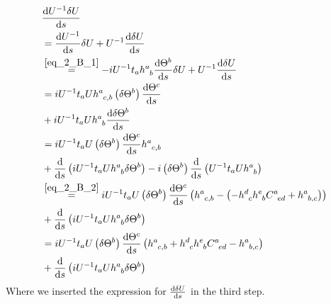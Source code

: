 \begin{align*} 
	&\derivative{U^{-1}\delta U}{s}\\
	&=\derivative{U^{-1}}{s}\delta U + U^{-1}\derivative{\delta U}{s}\\
	&\overset{\ref{eq_2_B_1}}{=}-iU^{-1} t_a h^a_{\hphantom{a}b}\derivative{\Theta^b}{s} \delta U + U^{-1}\derivative{\delta U}{s}\\
	&=i U^{-1} t_a U h^a_{\hphantom{a}c,b}\left(\delta\Theta^b\right)\derivative{\Theta^c}{s}\\
	&+i U^{-1} t_a U h^a_{\hphantom{a}b}\derivative{\delta\Theta^b}{s}  \\
	&=i U^{-1} t_a U \left(\delta\Theta^b\right)\derivative{\Theta^c}{s}h^a_{\hphantom{a}c,b}\\
	&+\derivative{}{s}\left(iU^{-1} t_a U h^a_{\hphantom{a}b}\delta\Theta^b\right)-i\left(\delta\Theta^b\right)\derivative{}{s}\left(U^{-1} t_a U h^a_{\hphantom{a}b}\right)\\
	&\overset{\ref{eq_2_B_2}}{=}i U^{-1} t_a U \left(\delta\Theta^b\right)\derivative{\Theta^c}{s}\left(h^a_{\hphantom{a}c,b}-\left(-h^d_{\hphantom{d}c}h^e_{\hphantom{e}b}C^a_{\hphantom{a}ed}+h^a_{\hphantom{a}b,c}\right)\right)\\
	&+\derivative{}{s}\left(iU^{-1} t_a U h^a_{\hphantom{a}b}\delta\Theta^b\right)\\
	&=i U^{-1} t_a U \left(\delta\Theta^b\right)\derivative{\Theta^c}{s}\left(h^a_{\hphantom{a}c,b}+h^d_{\hphantom{d}c}h^e_{\hphantom{e}b}C^a_{\hphantom{a}ed}-h^a_{\hphantom{a}b,c}\right)\\
	&+\derivative{}{s}\left(iU^{-1} t_a U h^a_{\hphantom{a}b}\delta\Theta^b\right)
\end{align*}
Where we inserted the expression for $\derivative{\delta U}{s}$ in the third step.

